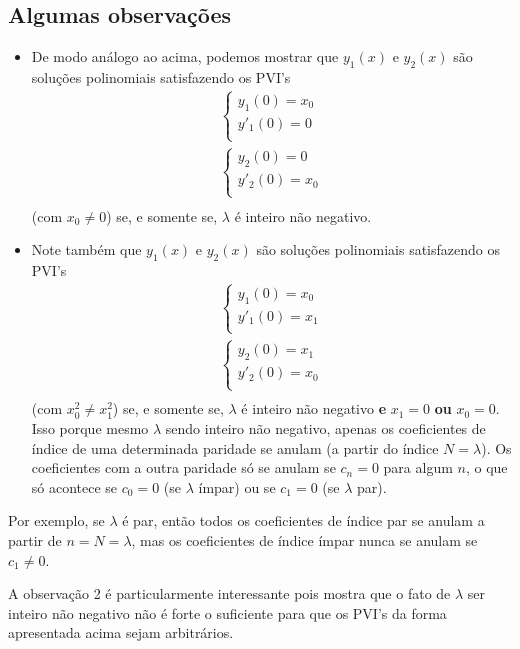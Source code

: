 \documentclass{article}
\begin{document}
\subsection{Algumas observações}
\begin{itemize}
    \item De modo análogo ao acima, podemos mostrar que $y_1(x)$ e $y_2(x)$ são soluções polinomiais satisfazendo os PVI's
\begin{align*}
\begin{cases}
y_1(0)  =  x_0 \\
y'_1(0) =  0 \\
\end{cases} \\
\begin{cases}
y_2(0) = 0 \\ 
y'_2(0) = x_0 \\
\end{cases} \\ 
\end{align*}
(com $x_0\neq 0$) se, e somente se, $\lambda $ é inteiro não negativo.

\item Note também que $y_1(x)$ e $y_2(x)$ são soluções polinomiais satisfazendo os PVI's
\begin{align*}
\begin{cases}
y_1(0)  =  x_0 \\
y'_1(0) =  x_1 \\
\end{cases} \\
\begin{cases}
y_2(0) = x_1 \\ 
y'_2(0) = x_0 \\
\end{cases} \\ 
\end{align*}
(com $x_0^2 \neq x_1^2$) se, e somente se, $\lambda$ é inteiro não negativo \textbf{e} $x_1 = 0$ \textbf{ou} $x_0 = 0$. Isso porque mesmo $\lambda $ sendo inteiro não negativo, apenas os coeficientes de índice de uma determinada paridade se anulam (a partir do índice $N = \lambda$). Os coeficientes com a outra paridade só se anulam se $c_n = 0$ para algum $n$, o que só acontece se $c_0 = 0$ (se $\lambda$ ímpar) ou se $c_1 = 0$ (se $\lambda$ par). 
\end{itemize}
\par Por exemplo, se $\lambda$ é par, então todos os coeficientes de índice par se anulam a partir de $n = N = \lambda$, mas os coeficientes de índice ímpar nunca se anulam se $c_1 \neq 0$.
\vspace{0.2cm}
\par A observação 2 é particularmente interessante pois mostra que o fato de $\lambda$ ser inteiro não negativo não é forte o suficiente para que os PVI's da forma apresentada acima sejam arbitrários.
\end{document}
